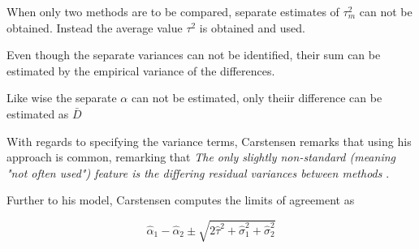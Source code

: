 \documentclass[12pt, a4paper]{report}
\theoremstyle{plain}
\theoremstyle{definition}
\theoremstyle{remark}
\begin{document}

When only two methods are to be compared, separate estimates of $\tau^2_m$ can not be obtained. Instead the average value $\tau^2$ is obtained and used.




\newpage
Even though the separate variances can not be identified, their sum can be estimated by the empirical variance of the differences.

Like wise the separate $\alpha$ can not be
estimated, only theiir difference can be estimated as
$\bar{D}$






With regards to specifying the variance terms, Carstensen remarks that using his approach is common, remarking that \emph{
	The only slightly non-standard (meaning "not often used") feature is the differing residual variances between methods }\citep{BXC2010}.



Further to his model, Carstensen computes the limits of agreement
as

\[
\hat{\alpha}_1 - \hat{\alpha}_2 \pm \sqrt{2 \hat{\tau}^2 +
	\hat{\sigma}^2_1 + \hat{\sigma}^2_2}
\]
\end{document}
